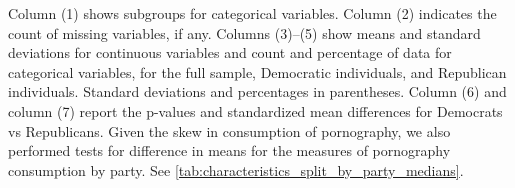 \documentclass[12pt, letterpaper]{article}
\begin{document}
\begin{table}[ht]
{		Column (1) shows subgroups for categorical variables.
		Column (2) indicates the count of missing variables, if any.
		Columns (3)--(5) show means and standard deviations for continuous variables and count and percentage of data for categorical variables, for the full sample, Democratic individuals, and Republican individuals.
		Standard deviations and percentages in parentheses.
		Column (6) and column (7) report the p-values and standardized mean differences for Democrats vs Republicans.
		Given the skew in consumption of pornography, we also performed tests for difference in means for the measures of pornography consumption by party. See \cref{tab:characteristics_split_by_party_medians}.
	}
\end{table}

\end{document}
